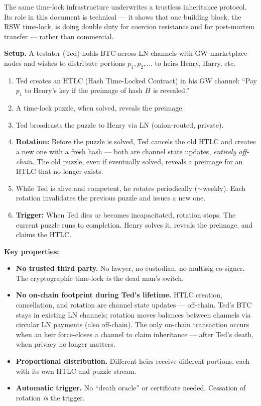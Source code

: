\documentclass[a4paper,11pt]{article}
\begin{document}
The same time-lock infrastructure underwrites a trustless inheritance protocol. Its role in this document is technical --- it shows that one building block, the RSW time-lock, is doing double duty for coercion resistance and for post-mortem transfer --- rather than commercial.

\medskip
\noindent\textbf{Setup.} A testator (Ted) holds BTC across LN channels with GW marketplace nodes and wishes to distribute portions $p_1, p_2, \ldots$ to heirs Henry, Harry, etc.

\begin{enumerate}[nosep,leftmargin=1.5em]
  \item Ted creates an HTLC (Hash Time-Locked Contract) in his GW channel: ``Pay $p_1$ to Henry's key if the preimage of hash $H$ is revealed.''
  \item A time-lock puzzle, when solved, reveals the preimage.
  \item Ted broadcasts the puzzle to Henry via LN (onion-routed, private).
  \item \textbf{Rotation:} Before the puzzle is solved, Ted cancels the old HTLC and creates a new one with a fresh hash --- both are channel state updates, \textit{entirely off-chain}. The old puzzle, even if eventually solved, reveals a preimage for an HTLC that no longer exists.
  \item While Ted is alive and competent, he rotates periodically ($\sim$weekly). Each rotation invalidates the previous puzzle and issues a new one.
  \item \textbf{Trigger:} When Ted dies or becomes incapacitated, rotation stops. The current puzzle runs to completion. Henry solves it, reveals the preimage, and claims the HTLC.
\end{enumerate}

\noindent\textbf{Key properties:}

\begin{itemize}[nosep,leftmargin=1.5em]
  \item \textbf{No trusted third party.} No lawyer, no custodian, no multisig co-signer. The cryptographic time-lock \textit{is} the dead man's switch.
  \item \textbf{No on-chain footprint during Ted's lifetime.} HTLC creation, cancellation, and rotation are channel state updates --- off-chain. Ted's BTC stays in existing LN channels; rotation moves balances between channels via circular LN payments (also off-chain). The only on-chain transaction occurs when an heir force-closes a channel to claim inheritance --- after Ted's death, when privacy no longer matters.
  \item \textbf{Proportional distribution.} Different heirs receive different portions, each with its own HTLC and puzzle stream.
  \item \textbf{Automatic trigger.} No ``death oracle'' or certificate needed. Cessation of rotation \textit{is} the trigger.
\end{itemize}
\end{document}
